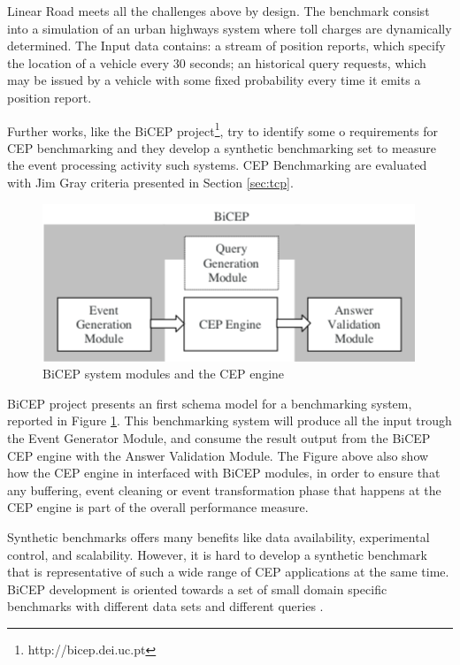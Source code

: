 Linear Road meets all the challenges above by design. The benchmark consist into a simulation of an urban highways system where toll charges are dynamically determined. The Input data contains: a stream of position reports, which specify the location of a vehicle every 30 seconds; an historical query requests, which may be issued by a vehicle with some fixed probability every time it emits a position report.

Further works, like the BiCEP project\footnote{http://bicep.dei.uc.pt}, try to identify some o requirements for CEP benchmarking and they develop a synthetic benchmarking set to measure the event processing activity such systems. CEP Benchmarking are evaluated with Jim Gray criteria presented in Section \ref{sec:tcp}. 

\begin{figure}[tbh]
  \centering
	\includegraphics[width=\linewidth]{images/bicep_schema}
	\caption{BiCEP system  modules and the CEP engine} 
  	\label{fig:bicep-schema}
\end{figure}

BiCEP project presents an first schema model for a benchmarking system, reported in Figure \ref{fig:bicep-schema}. This benchmarking system will produce all the input trough the Event Generator Module, and consume the result output from the BiCEP CEP engine with the Answer Validation Module. The Figure above also show how the CEP engine in interfaced with BiCEP modules, in order to ensure that any buffering, event cleaning or event transformation phase that happens at the CEP engine is part of the overall performance measure. 

Synthetic benchmarks offers many benefits like data availability, experimental control, and scalability. However, it is hard to develop a synthetic benchmark that is representative of such a wide range of CEP applications at the same time. BiCEP development is oriented towards a set of small domain specific benchmarks with different data sets and different queries \cite{bizarro:DSP:2007:1143}.

